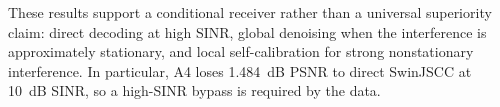 These results support a conditional receiver rather than a universal
superiority claim: direct decoding at high SINR, global denoising when the
interference is approximately stationary, and local self-calibration for
strong nonstationary interference.  In particular, A4 loses 1.484~dB PSNR to
direct SwinJSCC at 10~dB SINR, so a high-SINR bypass is required by the data.
